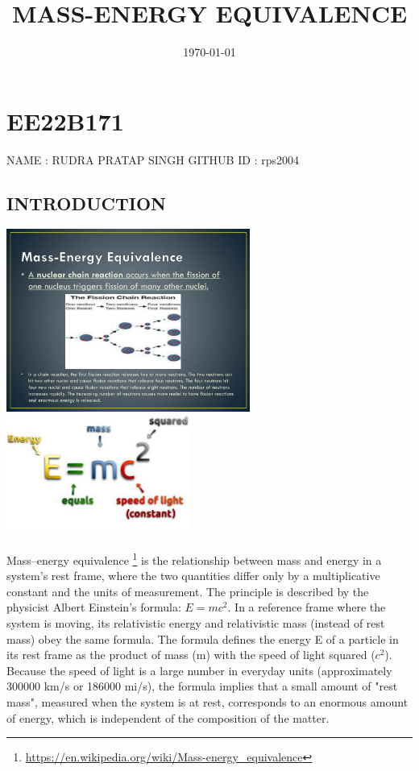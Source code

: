 \documentclass{article}
\title{MASS-ENERGY EQUIVALENCE}
\author{}
\date{\today}
\begin{document}
\maketitle
\section{EE22B171}
NAME : RUDRA PRATAP SINGH
\newline
GITHUB ID : rps2004
\subsection{INTRODUCTION}
\vspace{0.5cm}
\begin{center}
\includegraphics[width=8cm]{mass-energy-equivalence8-l.jpg}
\vspace{2cm}
\includegraphics[width=6cm]{energy.jpeg}
\end{center}
\vspace{0.5cm}

Mass–energy equivalence \footnote{\url{https://en.wikipedia.org/wiki/Mass-energy_equivalence}} is the relationship between mass and energy in a system's rest frame, where the two quantities differ only by a multiplicative constant and the units of measurement. The principle is described by the physicist Albert Einstein's formula: 
$E = mc^2$. In a reference frame where the system is moving, its relativistic energy and relativistic mass (instead of rest mass) obey the same formula.
The formula defines the energy E of a particle in its rest frame as the product of mass (m) with the speed of light squared ($c^2$). Because the speed of light is a large number in everyday units (approximately 300000 km/s or 186000 mi/s), the formula implies that a small amount of "rest mass", measured when the system is at rest, corresponds to an enormous amount of energy, which is independent of the composition of the matter.
\end{document}
